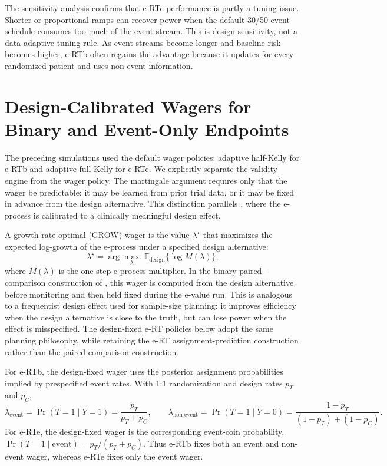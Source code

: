 \documentclass[10pt]{article}
\begin{document}


The sensitivity analysis confirms that e-RTe performance is partly a tuning issue. Shorter or proportional ramps can recover power when the default 30/50 event schedule consumes too much of the event stream. This is design sensitivity, not a data-adaptive tuning rule. As event streams become longer and baseline risk becomes higher, e-RTb often regains the advantage because it updates for every randomized patient and uses non-event information.

\section{Design-Calibrated Wagers for Binary and Event-Only Endpoints}

The preceding simulations used the default wager policies: adaptive half-Kelly for e-RTb and adaptive full-Kelly for e-RTe. We explicitly separate the validity engine from the wager policy. The martingale argument requires only that the wager be predictable: it may be learned from prior trial data, or it may be fixed in advance from the design alternative. This distinction parallels \citet{sokolova2026evalues}, where the e-process is calibrated to a clinically meaningful design effect.

A growth-rate-optimal (GROW) wager \citep{ramdas2025} is the value $\lambda^\star$ that maximizes the expected log-growth of the e-process under a specified design alternative:
\begin{equation}
\lambda^\star = \arg\max_\lambda \; \mathbb{E}_{\text{design}}\{\log M(\lambda)\},
\end{equation}
where $M(\lambda)$ is the one-step e-process multiplier. In the binary paired-comparison construction of \citet{sokolova2026evalues}, this wager is computed from the design alternative before monitoring and then held fixed during the e-value run. This is analogous to a frequentist design effect used for sample-size planning: it improves efficiency when the design alternative is close to the truth, but can lose power when the effect is misspecified. The design-fixed e-RT policies below adopt the same planning philosophy, while retaining the e-RT assignment-prediction construction rather than the paired-comparison construction.

For e-RTb, the design-fixed wager uses the posterior assignment probabilities implied by prespecified event rates. With 1:1 randomization and design rates $p_T$ and $p_C$,
\begin{equation}
\lambda_{\text{event}} =
\Pr(T = 1 \mid Y = 1)
= \frac{p_T}{p_T + p_C},
\qquad
\lambda_{\text{non-event}} =
\Pr(T = 1 \mid Y = 0)
= \frac{1 - p_T}{(1 - p_T) + (1 - p_C)}.
\end{equation}
For e-RTe, the design-fixed wager is the corresponding event-coin probability, $\Pr(T = 1 \mid \text{event}) = p_T/(p_T + p_C)$. Thus e-RTb fixes both an event and non-event wager, whereas e-RTe fixes only the event wager.
\end{document}
